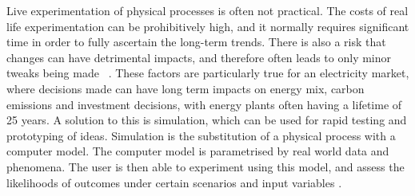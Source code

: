 Live experimentation of physical processes is often not practical. The costs of real life experimentation can be prohibitively high, and it normally requires significant time in order to fully ascertain the long-term trends. There is also a risk that changes can have detrimental impacts, and therefore often leads to only minor tweaks being made ~\cite{Forshaw2016}. These factors are particularly true for an electricity market, where decisions made can have long term impacts on energy mix, carbon emissions and investment decisions, with energy plants often having a lifetime of 25 years.  A solution to this is simulation, which can be used for rapid testing and prototyping of ideas. Simulation is the substitution of a physical process with a computer model. The computer model is parametrised by real world data and phenomena. The user is then able to experiment using this model, and assess the likelihoods of outcomes under certain scenarios and input variables \cite{Law:603360}.

